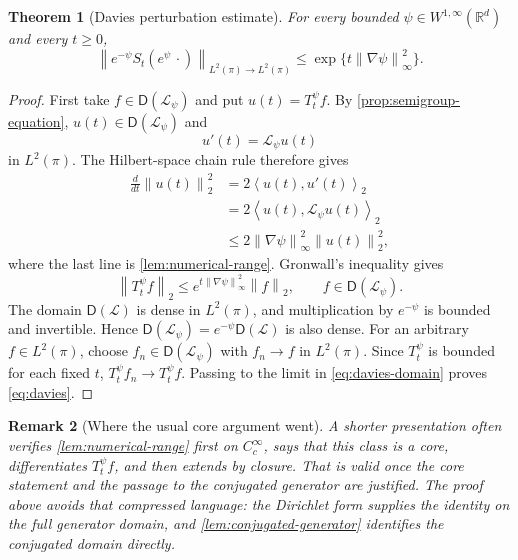 \documentclass[11pt]{article}
\newtheorem{theorem}{Theorem}[section]
\newtheorem{remark}[theorem]{Remark}
\newcommand{\R}{\mathbb R}
\newcommand{\ip}[2]{\left\langle #1,#2\right\rangle}
\newcommand{\norm}[1]{\left\lVert #1\right\rVert}
\newcommand{\1}{\mathbf 1}
\newcommand{\D}{\mathsf D}
\begin{document}
\begin{theorem}[Davies perturbation estimate]\label{thm:davies}
For every bounded \(\psi\in W^{1,\infty}(\R^d)\) and every \(t\geq0\),
\begin{equation}\label{eq:davies}
 \norm{e^{-\psi}S_t(e^\psi\,\cdot)}_{L^2(\pi)\to L^2(\pi)}
 \leq
 \exp\{t\norm{\nabla\psi}_\infty^2\}.
\end{equation}
\end{theorem}

\begin{proof}
First take \(f\in\D(\mathcal L_\psi)\) and put
\(u(t)=T_t^\psi f\).  By \cref{prop:semigroup-equation},
\(u(t)\in\D(\mathcal L_\psi)\) and
\[
 u'(t)=\mathcal L_\psi u(t)
\]
in \(L^2(\pi)\).  The Hilbert-space chain rule therefore gives
\begin{align*}
 \frac{d}{dt}\norm{u(t)}_2^2
 &=2\ip{u(t)}{u'(t)}_2\\
 &=2\ip{u(t)}{\mathcal L_\psi u(t)}_2\\
 &\leq2\norm{\nabla\psi}_\infty^2\norm{u(t)}_2^2,
\end{align*}
where the last line is \cref{lem:numerical-range}.  Gronwall's inequality
gives
\begin{equation}\label{eq:davies-domain}
 \norm{T_t^\psi f}_2
 \leq
 e^{t\norm{\nabla\psi}_\infty^2}\norm f_2,
 \qquad f\in\D(\mathcal L_\psi).
\end{equation}
The domain \(\D(\mathcal L)\) is dense in \(L^2(\pi)\), and multiplication
by \(e^{-\psi}\) is bounded and invertible.  Hence
\(\D(\mathcal L_\psi)=e^{-\psi}\D(\mathcal L)\) is also dense.  For an
arbitrary \(f\in L^2(\pi)\), choose
\(f_n\in\D(\mathcal L_\psi)\) with \(f_n\to f\) in \(L^2(\pi)\).
Since \(T_t^\psi\) is bounded for each fixed \(t\),
\(T_t^\psi f_n\to T_t^\psi f\).  Passing to the limit in
\eqref{eq:davies-domain} proves \eqref{eq:davies}.
\end{proof}

\begin{remark}[Where the usual core argument went]\label{rem:core}
A shorter presentation often verifies
\cref{lem:numerical-range} first on \(C_c^\infty\), says that this class is
a core, differentiates \(T_t^\psi f\), and then extends by closure.  That is
valid once the core statement and the passage to the conjugated generator
are justified.  The proof above avoids that compressed language: the
Dirichlet form supplies the identity on the full generator domain, and
\cref{lem:conjugated-generator} identifies the conjugated domain directly.
\end{remark}
\end{document}
